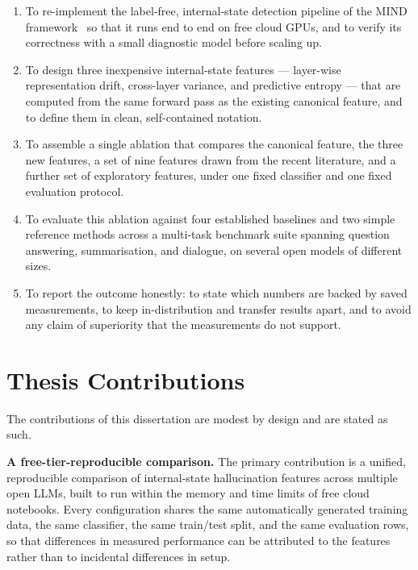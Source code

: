 \begin{enumerate}[leftmargin=2.2em,itemsep=0.3em]
\item To re-implement the label-free, internal-state detection pipeline of the MIND
framework~\cite{su2024mind} so that it runs end to end on free cloud GPUs, and to verify
its correctness with a small diagnostic model before scaling up.

\item To design three inexpensive internal-state features --- layer-wise representation
drift, cross-layer variance, and predictive entropy --- that are computed from the same
forward pass as the existing canonical feature, and to define them in clean,
self-contained notation.

\item To assemble a single ablation that compares the canonical feature, the three new
features, a set of nine features drawn from the recent literature, and a further set of
exploratory features, under one fixed classifier and one fixed evaluation protocol.

\item To evaluate this ablation against four established baselines and two simple
reference methods across a multi-task benchmark suite spanning question answering,
summarisation, and dialogue, on several open models of different sizes.

\item To report the outcome honestly: to state which numbers are backed by saved
measurements, to keep in-distribution and transfer results apart, and to avoid any claim
of superiority that the measurements do not support.
\end{enumerate}

\section{Thesis Contributions}

The contributions of this dissertation are modest by design and are stated as such.

\textbf{A free-tier-reproducible comparison.} The primary contribution is a unified,
reproducible comparison of internal-state hallucination features across multiple open
LLMs, built to run within the memory and time limits of free cloud notebooks. Every
configuration shares the same automatically generated training data, the same
classifier, the same train/test split, and the same evaluation rows, so that
differences in measured performance can be attributed to the features rather than to
incidental differences in setup.

